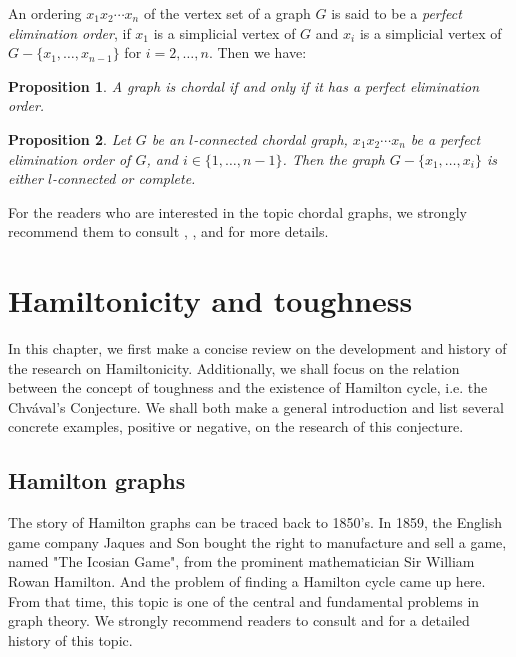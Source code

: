 \documentclass[12pt]{report}
\newtheorem{proposition}{Proposition}
\begin{document}
An ordering $x_1x_2\cdots x_n$ of the vertex set of a graph $G$ is said to be a {\em perfect elimination order}, if $x_1$ is a simplicial vertex of $G$ and $x_i$ is a simplicial vertex of $G-\{x_1,\ldots,x_{n-1}\}$ for $i=2,\ldots,n$. Then we have:
\begin{proposition}\label{c2.2}
A graph is chordal if and only if it has a perfect elimination order.
\end{proposition}
\begin{proposition}\label{c2.3}
Let $G$ be an $l$-connected chordal graph, $x_1x_2\cdots x_n$ be a perfect elimination order of $G$, and $i\in\{1,\ldots,n-1\}$. Then the graph $G-\{x_1,\ldots,x_i\}$ is either $l$-connected or complete.
\end{proposition}


For the readers who are interested in the topic chordal graphs, we strongly recommend them to consult \cite{bauer2000chordality}, \cite{bauer2000not}, \cite{bohme1999more} and \cite{chen1998tough} for more details.












\chapter{Hamiltonicity and toughness}\label{c2ht}
In this chapter, we first make a concise review on the development and history of the research on Hamiltonicity. Additionally, we shall  focus on the relation between the concept of toughness and the existence of Hamilton cycle, i.e. the Chv{\'a}val's Conjecture. We shall both  make a general introduction and list several concrete examples, positive or negative, on the research of this conjecture.

\section{Hamilton graphs}

The story of Hamilton graphs can be traced back to 1850's. In 1859, the English game company Jaques and Son bought the right to manufacture and sell a game, named "The Icosian Game", from the prominent mathematician Sir William Rowan Hamilton. And the problem of finding a Hamilton cycle came up here. From that time, this topic is one of the central and fundamental problems in graph theory. We strongly recommend readers to consult \cite{gould1991updating} and \cite{MR2221006} for a detailed history of this topic.
\end{document}
